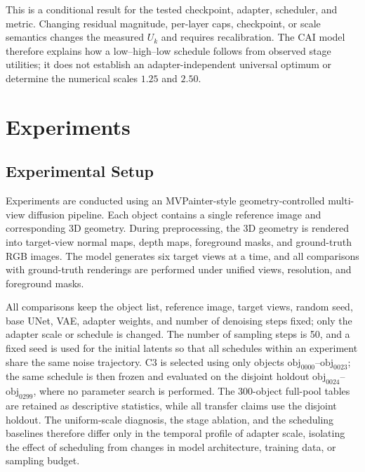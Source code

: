 \documentclass[times,twocolumn,final]{elsarticle}
\begin{document}
This is a conditional result for the tested checkpoint, adapter, scheduler, and metric. Changing residual magnitude, per-layer caps, checkpoint, or scale semantics changes the measured $U_k$ and requires recalibration. The CAI model therefore explains how a low--high--low schedule follows from observed stage utilities; it does not establish an adapter-independent universal optimum or determine the numerical scales $1.25$ and $2.50$.

\section{Experiments}
\label{sec:experiments}

\subsection{Experimental Setup}
\label{subsec:setup}

Experiments are conducted using an MVPainter-style geometry-controlled multi-view diffusion pipeline. Each object contains a single reference image and corresponding 3D geometry. During preprocessing, the 3D geometry is rendered into target-view normal maps, depth maps, foreground masks, and ground-truth RGB images. The model generates six target views at a time, and all comparisons with ground-truth renderings are performed under unified views, resolution, and foreground masks.

All comparisons keep the object list, reference image, target views, random seed, base UNet, VAE, adapter weights, and number of denoising steps fixed; only the adapter scale or schedule is changed. The number of sampling steps is 50, and a fixed seed is used for the initial latents so that all schedules within an experiment share the same noise trajectory. C3 is selected using only objects $\mathrm{obj}_{0000}$--$\mathrm{obj}_{0023}$; the same schedule is then frozen and evaluated on the disjoint holdout $\mathrm{obj}_{0024}$--$\mathrm{obj}_{0299}$, where no parameter search is performed. The 300-object full-pool tables are retained as descriptive statistics, while all transfer claims use the disjoint holdout. The uniform-scale diagnosis, the stage ablation, and the scheduling baselines therefore differ only in the temporal profile of adapter scale, isolating the effect of scheduling from changes in model architecture, training data, or sampling budget.
\end{document}
